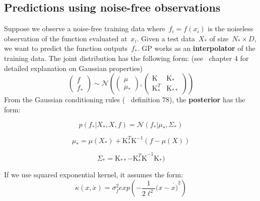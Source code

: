 \documentclass[]{IEEEtran}
\begin{document}
\subsection{Predictions using noise-free observations }
Suppose we observe a noise-free training data where~\({ f }_{ i }=f({ x }_{ i })\) is the noiseless observation of the function evaluated at~\({ x }_{ i }\). Given a test data~\({ X }_{ * }\) of size~\({ N }_{ * } \times D\), we want to predict the function outputs~\({ f }_{ * }\). GP works as an \textbf{interpolator} of the training data. The joint distribution has the following form: (see~\cite{Mur2012} chapter 4 for detailed explanation on Gaussian properties)
\begin{equation}
\begin{pmatrix} f \\ { f }_{ * } \end{pmatrix}\sim \mathcal{N} \left( \begin{pmatrix} \mu  \\ { \mu  }_{ * } \end{pmatrix},\begin{pmatrix} \mathrm{K}  & { \mathrm{K}  }_{ * } \\ { \mathrm{K}  }_{ * }^{ T } & { \mathrm{K}  }_{ ** } \end{pmatrix} \right) 
\label{eqM15p6}
\end{equation}
From the  Gaussian conditioning rules (~\cite{Bar2010} definition 78), the \textbf{posterior} has the form:

\begin{equation}
p({ f }_{ * }|{ X }_{ * },X,f)=\mathcal{N}({ f }_{ * }|{ \mu  }_{ * },{ \Sigma  }_{ * })
\label{eq15p9A}
\end{equation}

\begin{equation}
{ \mu  }_{ * }=\mu ({ X }_{ * })+{ \mathrm{K}  }_{ * }^{ T }{ \mathrm{K}  }^{ -1 }(f-\mu (X))
\label{eq15p9B}
\end{equation}

\begin{equation}
{ \Sigma  }_{ * }={ \mathrm{K}  }_{ ** }{ -{ \mathrm{K}  }_{ * }^{ T }\mathrm{K}  }^{ -1 }{ \mathrm{K}  }_{ * })
\label{eq15p9C}
\end{equation}

If we use  squared exponential kernel, it assumes the form:
\begin{equation}
\kappa (x,\acute { x } )={ \sigma  }_{ f }^{ 2 }exp(-\frac { 1 }{ 2{ \ell  }^{ 2 } } { (x-\acute { x) }  }^{ 2 })
\label{M15p10}
\end{equation}
\end{document}
